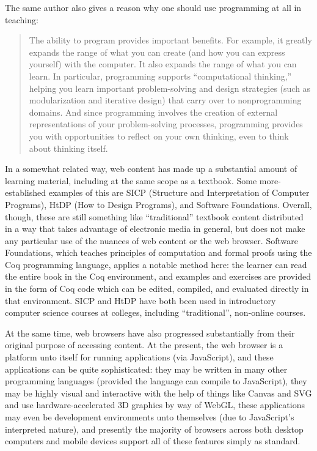 \documentclass{sig-alternate-05-2015}
\begin{document}
The same author also gives a reason why one should use programming at
all in teaching:

\blockquote{The ability to program provides important benefits. For
  example, it greatly expands the range of what you can create (and
  how you can express yourself) with the computer. It also expands the
  range of what you can learn. In particular, programming supports
  ``computational thinking,'' helping you learn important
  problem-solving and design strategies (such as modularization and
  iterative design) that carry over to nonprogramming domains. And
  since programming involves the creation of external representations
  of your problem-solving processes, programming provides you with
  opportunities to reflect on your own thinking, even to think about
  thinking itself.}


In a somewhat related way, web content has made up a substantial
amount of learning material, including at the same scope as a
textbook.  Some more-established examples of this are SICP (Structure
and Interpretation of Computer Programs)\cite{SICP}, HtDP (How to
Design Programs)\cite{HTDP}, and Software Foundations\cite{SF}.
Overall, though, these are still something like ``traditional''
textbook content distributed in a way that takes advantage of
electronic media in general, but does not make any particular use of
the nuances of web content or the web browser.  Software Foundations,
which teaches principles of computation and formal proofs using the
Coq programming language, applies a notable method here: the learner
can read the entire book in the Coq environment, and examples and
exercises are provided in the form of Coq code which can be edited,
compiled, and evaluated directly in that environment.  SICP and HtDP
have both been used in introductory computer science courses at
colleges, including ``traditional'', non-online
courses\cite{Felleisen,WhySICP}.

At the same time, web browsers have also progressed substantially from
their original purpose of accessing content.  At the present, the web
browser is a platform unto itself for running applications (via
JavaScript), and these applications can be quite sophisticated: they
may be written in many other programming languages (provided the
language can compile to JavaScript), they may be highly visual and
interactive with the help of things like Canvas and SVG and use
hardware-accelerated 3D graphics by way of WebGL, these applications
may even be development environments unto themselves (due to
JavaScript's interpreted nature), and presently the majority of
browsers across both desktop computers and mobile devices support all
of these features simply as standard.
\end{document}

